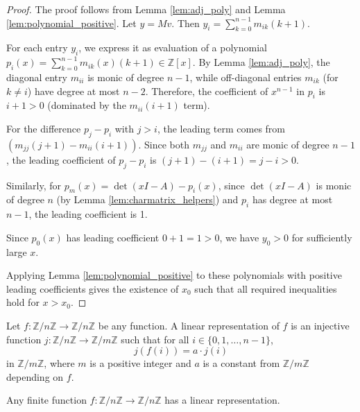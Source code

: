 \begin{proof}
\leanok
The proof follows from Lemma \ref{lem:adj_poly} and Lemma \ref{lem:polynomial_positive}.
Let $y = Mv$. Then $y_i = \sum_{k=0}^{n-1} m_{ik} (k+1)$.

For each entry $y_i$, we express it as evaluation of a polynomial $p_i(x) = \sum_{k=0}^{n-1} m_{ik}(x) (k+1) \in \mathbb{Z}[x]$.
By Lemma \ref{lem:adj_poly}, the diagonal entry $m_{ii}$ is monic of degree $n-1$, while off-diagonal entries $m_{ik}$ (for $k \neq i$) have degree at most $n-2$.
Therefore, the coefficient of $x^{n-1}$ in $p_i$ is $i+1 > 0$ (dominated by the $m_{ii} (i+1)$ term).

For the difference $p_j - p_i$ with $j > i$, the leading term comes from $(m_{jj} (j+1) - m_{ii} (i+1))$. Since both $m_{jj}$ and $m_{ii}$ are monic of degree $n-1$, the leading coefficient of $p_j - p_i$ is $(j+1) - (i+1) = j - i > 0$.

Similarly, for $p_m(x) = \det(x I - A) - p_i(x)$, since $\det(x I - A)$ is monic of degree $n$ (by Lemma \ref{lem:charmatrix_helpers}) and $p_i$ has degree at most $n-1$, the leading coefficient is 1.

Since $p_0(x)$ has leading coefficient $0+1 = 1 > 0$, we have $y_0 > 0$ for sufficiently large $x$.

Applying Lemma \ref{lem:polynomial_positive} to these polynomials with positive leading coefficients gives the existence of $x_0$ such that all required inequalities hold for $x > x_0$.
\end{proof}

\begin{definition}
\label{def:linear_representation}
\leanok
Let $f: \mathbb{Z}/n\mathbb{Z} \to \mathbb{Z}/n\mathbb{Z}$ be any function. A linear representation of $f$ is an injective function $j: \mathbb{Z}/n\mathbb{Z} \to \mathbb{Z}/m\mathbb{Z}$ 
such that for all $i\in \{0,1,\ldots,n-1\}$,
$$j(f(i)) = a \cdot j(i)$$
in $\mathbb{Z}/m\mathbb{Z}$, where $m$ is a positive integer and $a$ is a constant from $\mathbb{Z}/m\mathbb{Z}$ depending on $f$.
\end{definition}

\begin{theorem}
\label{thm:linear_representation}
\leanok
{}
Any finite function $f: \mathbb{Z}/n\mathbb{Z} \to \mathbb{Z}/n\mathbb{Z}$ has a linear representation.
\end{theorem}

